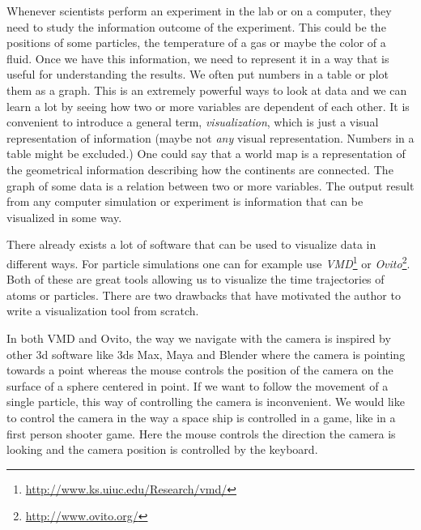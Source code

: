 Whenever scientists perform an experiment in the lab or on a computer, they need to study the information outcome of the experiment. This could be the positions of some particles, the temperature of a gas or maybe the color of a fluid. Once we have this information, we need to represent it in a way that is useful for understanding the results. We often put numbers in a table or plot them as a graph. This is an extremely powerful ways to look at data and we can learn a lot by seeing how two or more variables are dependent of each other. It is convenient to introduce a general term, \textit{visualization}, which is just a visual representation of information (maybe not \textit{any} visual representation. Numbers in a table might be excluded.) One could say that a world map is a representation of the geometrical information describing how the continents are connected. The graph of some data is a relation between two or more variables. The output result from any computer simulation or experiment is information that can be visualized in some way.

There already exists a lot of software that can be used to visualize data in different ways. For particle simulations one can for example use \textit{VMD}\footnote{\url{http://www.ks.uiuc.edu/Research/vmd/}} or \textit{Ovito}\footnote{\url{http://www.ovito.org/}}. Both of these are great tools allowing us to visualize the time trajectories of atoms or particles. There are two drawbacks that have motivated the author to write a visualization tool from scratch.

In both VMD and Ovito, the way we navigate with the camera is inspired by other 3d software like 3ds Max, Maya and Blender where the camera is pointing towards a point whereas the mouse controls the position of the camera on the surface of a sphere centered in point. If we want to follow the movement of a single particle, this way of controlling the camera is inconvenient. We would like to control the camera in the way a space ship is controlled in a game, like in a first person shooter game. Here the mouse controls the direction the camera is looking and the camera position is controlled by the keyboard.

